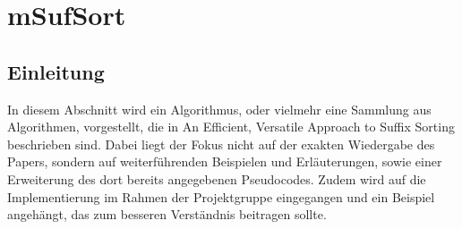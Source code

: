 \section{mSufSort}

\subsection{Einleitung}

In  diesem Abschnitt wird ein Algorithmus, oder vielmehr eine Sammlung aus Algorithmen, vorgestellt, die in \glqq An Efficient, Versatile Approach to Suffix Sorting\grqq \cite{Maniscalco} beschrieben sind. Dabei liegt der Fokus nicht auf der exakten Wiedergabe des Papers, sondern auf weiterführenden Beispielen und Erläuterungen, sowie einer Erweiterung des dort bereits angegebenen Pseudocodes. Zudem wird auf die Implementierung im Rahmen der Projektgruppe eingegangen und ein Beispiel angehängt, das zum besseren Verständnis beitragen sollte.\\

